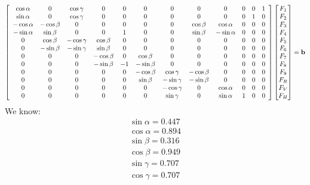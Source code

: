 \documentclass{article}
\begin{document}
\begin{align*}
\left[\begin{array}{cccccccccccc}
\cos\alpha & 0 & \cos\gamma & 0 & 0 & 0 & 0 & 0 & 0 & 0 & 0 & 1 \\ 
\sin\alpha & 0 & \cos\gamma & 0 & 0 & 0 & 0 & 0 & 0 & 0 & 1 & 0 \\ 
-\cos\alpha & -\cos\beta & 0 & 0 & 0 & 0 & 0 & \cos\beta & \cos\alpha & 0 & 0 & 0 \\ 
-\sin\alpha & \sin\beta & 0 & 0 & 1 & 0 & 0 & \sin\beta & -\sin\alpha & 0 & 0 & 0 \\ 
0 & \cos\beta & -\cos\gamma & \cos\beta & 0 & 0 & 0 & 0 & 0 & 0 & 0 & 0 \\ 
0 & -\sin\beta & -\sin\gamma & \sin\beta & 0 & 0 & 0 & 0 & 0 & 0 & 0 & 0 \\ 
0 & 0 & 0 & -\cos\beta & 0 & \cos\beta & 0 & 0 & 0 & 0 & 0 & 0 \\ 
0 & 0 & 0 & -\sin\beta & -1 & -\sin\beta & 0 & 0 & 0 & 0 & 0 & 0 \\ 
0 & 0 & 0 & 0 & 0 & -\cos\beta & \cos\gamma & -\cos\beta & 0 & 0 & 0 & 0 \\ 
0 & 0 & 0 & 0 & 0 & \sin\beta & -\sin\gamma & -\sin\beta & 0 & 0 & 0 & 0 \\ 
0 & 0 & 0 & 0 & 0 & 0 & -\cos\gamma & 0 & \cos\alpha & 0 & 0 & 0 \\
0 & 0 & 0 & 0 & 0 & 0 & \sin\gamma & 0 & \sin\alpha & 1 & 0 & 0 \\  
\end{array}\right]
\begin{bmatrix} F_1 \\ F_2 \\ F_3 \\ F_4 \\ F_5 \\ F_6 \\ F_7 \\ F_8 \\ F_9 \\ F_R \\ F_V \\ F_H  \end{bmatrix}=\boldsymbol{\mathrm{b}}
\end{align*} 
We know: \\
\begin{align*}
\sin\alpha = 0.447 \\
\cos\alpha = 0.894 \\
\sin\beta = 0.316\\
\cos\beta =  0.949\\
\sin\gamma = 0.707 \\ 
\cos\gamma =0.707 \\ 
\end{align*} 
\end{document}
